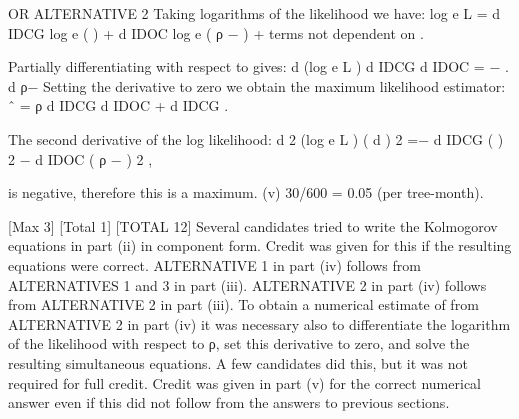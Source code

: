 \documentclass[a4paper,12pt]{article}
\begin{document}
OR ALTERNATIVE 2
Taking logarithms of the likelihood we have:
log e L = d IDCG log e ( \tau ) + d IDOC log e ( ρ − \tau ) + terms not dependent on \tau.

Partially differentiating with respect to \tau gives:
d (log e L ) d IDCG d IDOC
=
−
.
d \tau
\tau
ρ−\tau 
Setting the derivative to zero 
we obtain the maximum likelihood estimator:
\tau ˆ =
ρ d IDCG
d IDOC + d IDCG
.

The second derivative of the log likelihood:
d 2 (log e L )
( d \tau ) 2
=−
d IDCG
( \tau ) 2
−
d IDOC
( ρ − \tau ) 2
,

is negative, therefore this is a maximum.
(v)
30/600 = 0.05 (per tree-month).

[Max 3]
[Total 1]
[TOTAL 12]
Several candidates tried to write the Kolmogorov equations in part (ii) in
component form. Credit was given for this if the resulting equations were
correct. ALTERNATIVE 1 in part (iv) follows from ALTERNATIVES 1 and 3 in
part (iii). ALTERNATIVE 2 in part (iv) follows from ALTERNATIVE 2 in part
(iii). To obtain a numerical estimate of \tau from ALTERNATIVE 2 in part (iv) it
was necessary also to differentiate the logarithm of the likelihood with respect
to ρ, set this derivative to zero, and solve the resulting simultaneous
equations. A few candidates did this, but it was not required for full credit.
Credit was given in part (v) for the correct numerical answer even if this did
not follow from the answers to previous sections.
\end{document}
